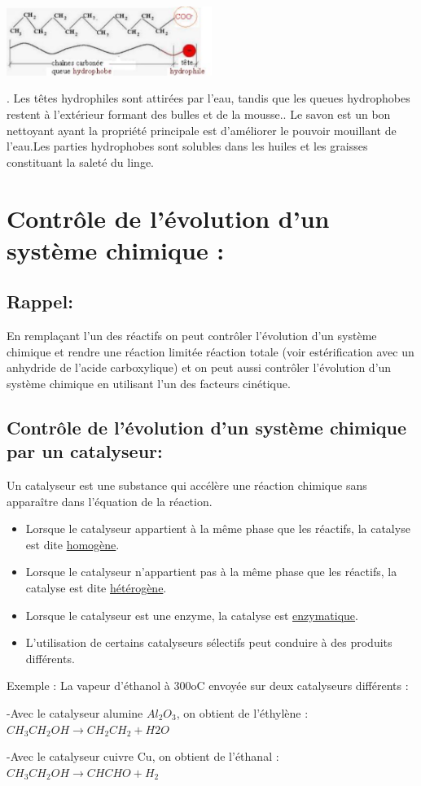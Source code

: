 \documentclass[12pt]{article}
\begin{document}
\begin{center}
	\includegraphics[width=0.5\textwidth]{./img/file.png}
\end{center}




. Les têtes hydrophiles sont attirées par l’eau, tandis que les queues hydrophobes restent à l’extérieur formant des bulles et de la
mousse.. Le savon est un bon nettoyant ayant la propriété principale est d’améliorer le pouvoir mouillant de l’eau.Les parties
hydrophobes sont solubles dans les huiles et les graisses constituant la saleté du linge.

\section{Contrôle de l'évolution d'un système chimique : }
\subsection{Rappel:} 

En remplaçant l'un des réactifs on peut contrôler l'évolution d'un système chimique et rendre une réaction limitée réaction totale (voir estérification avec un anhydride de l'acide carboxylique) et on peut aussi contrôler l'évolution d'un
système chimique en utilisant l'un des facteurs cinétique.


\subsection{Contrôle de l'évolution d'un système chimique par un catalyseur:}
Un catalyseur est une substance qui accélère une réaction chimique sans apparaître dans l’équation de la réaction.

\begin{itemize}
	\item Lorsque le catalyseur appartient à la même phase que les réactifs, la catalyse est dite \underline{homogène}.
	\item Lorsque le catalyseur n’appartient pas à la même phase que les réactifs, la catalyse est dite \underline{hétérogène}.
\item Lorsque le catalyseur est une enzyme, la catalyse est \underline{enzymatique}.
\item L'utilisation de certains catalyseurs sélectifs peut conduire à des produits différents.

\end{itemize}
Exemple : La vapeur d'éthanol à 300oC envoyée sur deux catalyseurs différents :

-Avec le catalyseur alumine $Al_2O_3$, on obtient de l'éthylène :$CH_3CH_2OH\rightarrow CH_2CH_2+ H2O$

-Avec le catalyseur cuivre Cu, on obtient de l'éthanal : $CH_3CH_2OH \rightarrow CHCHO + H_2$ 
\end{document}
